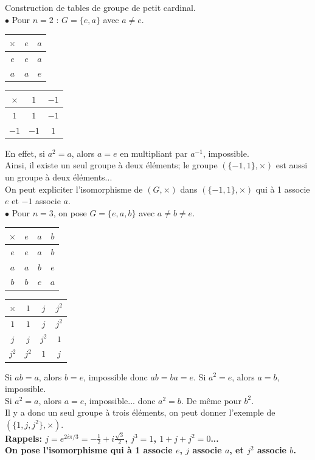 \documentclass[11pt]{article}
\begin{document}
\vspace*{-0.7cm}

\begin{ex}{}{}
    Construction de tables de groupe de petit cardinal.\\
    $\bullet$ Pour $n=2$ : $G=\{e,a\}$ avec $a\neq e$.  
    \begin{center}
        \begin{tabular}{c|cc}
            $\times$ & $e$ & $a$ \\
            \hline
            $e$ & $e$ & $a$ \\
            $a$ & $a$ & $e$
        \end{tabular} \hspace*{1cm}
        \begin{tabular}{c|cc}
            $\times$ & $1$ & $-1$ \\
            \hline
            $1$ & $1$ & $-1$ \\
            $-1$ & $-1$ & $1$
        \end{tabular}
    \end{center}
    En effet, si $a^2=a$, alors $a=e$ en multipliant par $a^{-1}$, impossible.\\
    Ainsi, il existe un seul groupe à deux éléments; le groupe $(\{-1,1\},\times)$ est aussi un groupe à deux éléments...\\
    On peut expliciter l'isomorphisme de $(G,\times)$ dans $(\{-1,1\},\times)$ qui à 1 associe $e$ et $-1$ associe $a$.\\
    $\bullet$ Pour $n=3$, on pose $G=\{e,a,b\}$ avec $a\neq b \neq e$.
    \begin{center}
        \begin{tabular}{c|ccc}
            $\times$ & $e$ & $a$ & $b$\\
            \hline
            $e$ & $e$ & $a$ & $b$\\
            $a$ & $a$ & $b$ & $e$\\
            $b$ & $b$ & $e$ & $a$
        \end{tabular}
        \hspace*{1cm}
        \begin{tabular}{c|ccc}
            $\times$ & $1$ & $j$ & $j^2$\\
            \hline
            $1$ & $1$ & $j$ & $j^2$\\
            $j$ & $j$ & $j^2$ & $1$\\
            $j^2$ & $j^2$ & $1$ & $j$
        \end{tabular}
    \end{center}
    Si $ab=a$, alors $b=e$, impossible donc $ab=ba=e$. Si $a^2=e$, alors $a=b$, impossible.\\
    Si $a^2=a$, alors $a=e$, impossible... donc $a^2=b$. De même pour $b^2$.\\
    Il y a donc un seul groupe à trois éléments, on peut donner l'exemple de $(\{1,j,j^2\},\times)$.\\
    \bf{Rappels:} $j=e^{2i\pi/3}=-\frac{1}{2}+i\frac{\sqrt{3}}{2}$, $j^3=1$, $1+j+j^2=0$...\\
    On pose l'isomorphisme qui à 1 associe $e$, $j$ associe $a$, et $j^2$ associe $b$.
\end{ex}
\end{document}
